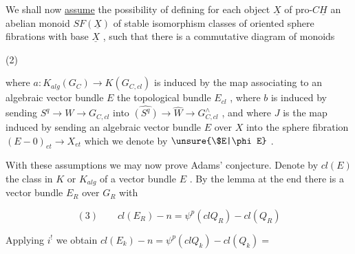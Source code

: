 
We shall now \uline{assume}  the possibility of defining
for each object $\underline{X}$ of pro-$C\underline H$ an abelian monoid $SF(\underline{X})$ of stable
isomorphism classes of oriented sphere fibrations with base $\underline{X}$ ,
such that there is a commutative diagram of monoids

(2)

where $a:K_{alg}(G_C) \to K(G_{C,cl})$ is induced by the map associating to
an algebraic vector bundle $E$ the topological bundle $E_{cl}$ , where
$b$ is induced by sending $S^q \to W \to G_{C,cl}$ into $\widehat{(S^q)} \to \hat{W} \to G^{\wedge}_{C,cl}$ ,
and where $J$ is the map induced by sending an algebraic vector
bundle $E$ over $X$ into the sphere fibration $(E - 0)_{et} \to X_{et}$
which we denote by $\unsure{\$E|\phi E}$ .

With these assumptions we may now prove Adams' conjecture.
Denote by $cl(E)$ the class in $K$ or $K_{alg}$ of a vector bundle $E$ .
By the lemma at the end there is a vector bundle $E_R$ over $G_R$ with

\[ (3) \qquad cl(E_R) - n = \psi^p(clQ_R) - cl(Q_R) \]

Applying $i^!$ we obtain $cl(E_k) - n = \psi^p(clQ_k) - cl(Q_k) =$

